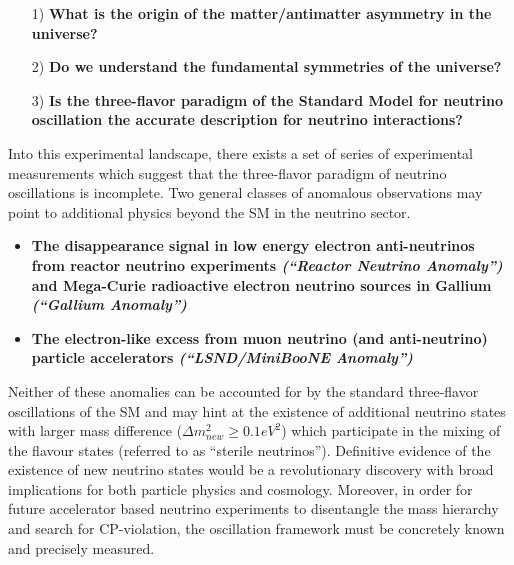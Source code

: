 \begin{itemize}
\item[1)] \textbf{What is the origin of the matter/antimatter asymmetry in the universe?}

\item[2)] \textbf{Do we understand the fundamental symmetries of the universe?}

\item[3)] \textbf{Is the three-flavor paradigm of the Standard Model for neutrino oscillation the accurate description for neutrino interactions?}
\end{itemize}

Into this experimental landscape, there exists a set of series of experimental measurements which suggest that the three-flavor paradigm of neutrino oscillations is incomplete. Two general classes of anomalous observations may point to additional physics beyond the SM  in the neutrino sector.

\begin{itemize}
\item \textbf{The disappearance signal in low energy electron anti-neutrinos from reactor neutrino experiments \cite{No13} \textit{(``Reactor Neutrino Anomaly'')} and Mega-Curie radioactive electron neutrino sources in Gallium \cite{No14, No15} \textit{(``Gallium Anomaly'')}}

\item \textbf{The electron-like excess from muon neutrino (and anti-neutrino) particle accelerators \textit{(``LSND/MiniBooNE Anomaly'')} \cite{No16, No17}}

\end{itemize}

Neither of these anomalies can be accounted for by the standard three-flavor oscillations of the SM and may hint at the existence of additional neutrino states with larger mass difference ($\Delta m_{new}^{2}\geq 0.1 eV^{2}$) which participate in the mixing of the flavour states (referred to as ``sterile neutrinos''). Definitive evidence of the existence of new neutrino states would be a revolutionary discovery with broad implications for both particle physics and cosmology. Moreover, in order for future accelerator based neutrino experiments to disentangle the mass hierarchy and search for CP-violation, the oscillation framework must be concretely known and precisely measured.

